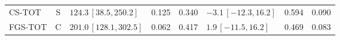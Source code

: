 \begin{longtable}{lcp{37mm}rrp{37mm}rr}
CS-TOT & S & \(124.3\,[38.5,250.2]\) & 0.125 & 0.340 & \(-3.1\,[-12.3,16.2]\) & 0.594 & 0.090\\
FGS-TOT & C & \(201.0\,[128.1,302.5]\) & 0.062 & 0.417 & \(1.9\,[-11.5,16.2]\) & 0.469 & 0.083\\

\end{longtable}
